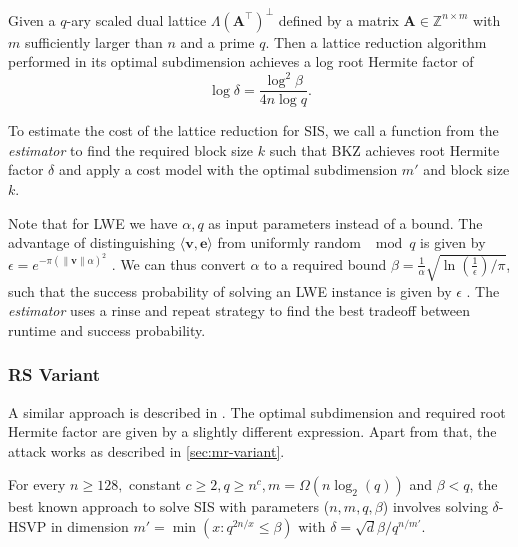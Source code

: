 \begin{theorem}
  Given a $q$-ary scaled dual lattice $\Lambda(\mathbf{A}^\intercal)^{\perp}$ defined by a matrix $\mathbf{A} \in \mathbb{Z}^{n \times m}$ with $m$ sufficiently larger than $n$ and a prime $q$. Then a lattice reduction algorithm performed in its optimal subdimension achieves a log root Hermite factor of
  \begin{equation}
    \log \delta = \frac{\log^2 \beta}{4n \log q}. \label{eq:mr-log-RHF}
  \end{equation}
\end{theorem}

To estimate the cost of the lattice reduction for SIS, we call a function from the \textit{estimator} to find the required block size $k$ such that BKZ achieves root Hermite factor $\delta$ and apply a cost model with the optimal subdimension $m'$ and block size $k$.

Note that for LWE we have $\alpha, q$ as input parameters instead of a bound. The advantage of distinguishing $\langle \mathbf{v}, \mathbf{e}\rangle$ from uniformly random $\mod q$ is given by  $\epsilon = e^{-\pi (\| \mathbf{v}\| \alpha)^2}$ \cite{LP11}. We can thus convert $\alpha$ to a required bound $\beta = \frac{1}{\alpha} \sqrt{\ln (\frac{1}{\epsilon})/ \pi}$, such that the success probability of solving an LWE instance is given by $\epsilon$ \cite[Corollary~2]{APS15}. The \textit{estimator} uses a rinse and repeat strategy to find the best tradeoff between runtime and success probability.






\subsubsection{RS Variant \cite{RS10}}

A similar approach is described in \cite{RS10}. The optimal subdimension and required root Hermite factor are given by a slightly different expression. Apart from that, the attack works as described in \cref{sec:mr-variant}.

\begin{theorem}
  For every $n \geq 128,$ constant $c \geq 2, q \geq n^c, m = \Omega(n \log_2(q))$ and $\beta < q$, the best known approach to solve SIS with parameters ($n, m, q, \beta$) involves solving $\delta$-HSVP in dimension $m' = \min(x : q^{2n/x} \leq \beta)$ with $\delta = \sqrt{d}{\beta / q^{n/m'}}$.
\end{theorem}

